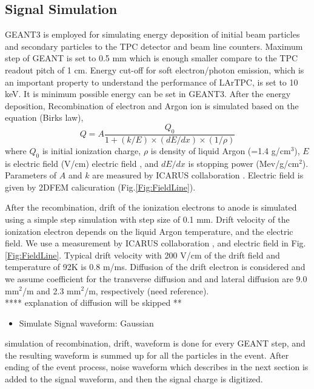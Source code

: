 \subsection{Signal Simulation}
GEANT3 is employed for simulating energy deposition of 
initial beam particles and secondary particles to the TPC detector and beam line counters. 
Maximum step of GEANT is set to 0.5 mm which is enough smaller compare to the TPC readout pitch of 1 cm.
Energy cut-off for soft electron/photon emission, which is an important property to understand the
performance of LArTPC, is set to 10 keV. It is minimum possible energy can be set in GEANT3.
After the energy deposition, Recombination of electron and Argon ion is simulated based on the equation (Birks law),
\begin{equation}
  Q = A\frac{Q_{0}}{1+(k/E)\times(dE/dx)\times(1/\rho)}
\label{eq:birkslaw}
\end{equation}
where $Q_{0}$ is initial ionization charge, $\rho$ is density of liquid Argon (=1.4 g/cm$^3$),
$E$ is electric field (V/cm) electric field , and $dE/dx$ is stopping power (Mev/g/cm$^2$).
Parameters of $A$ and $k$ are measured by ICARUS collaboration \cite{658352}.
Electric field is given by 2DFEM calicuration (Fig.\ref{Fig:FieldLine}).

After the recombination, drift of the ionization electrons to anode is simulated
using a simple step simulation with step size of 0.1 mm.
Drift velocity of the ionization electron depends on the liquid Argon temperature,
and the electric field. We use a measurement by ICARUS collaboration \cite{649233}, and
electric field in Fig.\ref{Fig:FieldLine}. Typical drift velocity with 200 V/cm of 
the drift field and temperature of 92K is 0.8 m/ms.
Diffusion of the drift electron is considered and we assume coefficient for the transverse diffusion 
and and lateral diffusion are 9.0 mm$^2$/m and 2.3 mm$^2$/m, respectively (need reference).
\\
**** explanation of diffusion will be skipped **

\begin{itemize}
\item Simulate Signal waveform: Gaussian
\end{itemize}
simulation of recombination, drift, waveform is done for every GEANT step, and
the resulting waveform is summed up for all the particles in the event.
After ending of the event process, noise waveform which describes in the next section is added to the signal waveform,
and then the signal charge is digitized.

